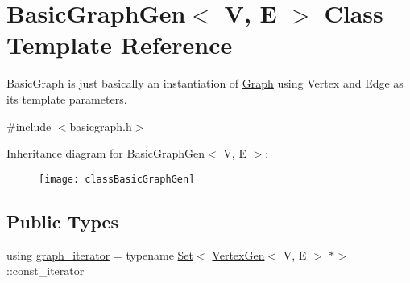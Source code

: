 \hypertarget{classBasicGraphGen}{}\section{Basic\+Graph\+Gen$<$ V, E $>$ Class Template Reference}
\label{classBasicGraphGen}


Basic\+Graph is just basically an instantiation of \mbox{\hyperlink{classGraph}{Graph}} using Vertex and Edge as its template parameters.  




{\ttfamily \#include $<$basicgraph.\+h$>$}

Inheritance diagram for Basic\+Graph\+Gen$<$ V, E $>$\+:\begin{figure}[H]
\begin{center}
\leavevmode
\texttt{[image: classBasicGraphGen]}
\end{center}
\end{figure}
\subsection*{Public Types}
\begin{DoxyCompactItemize}
\item 
using \mbox{\hyperlink{classGraph_a695969c31e87f9e8319d74e5ca39024b}{graph\+\_\+iterator}} = typename \mbox{\hyperlink{classstanfordcpplib_1_1collections_1_1GenericSet}{Set}}$<$ \mbox{\hyperlink{classVertexGen}{Vertex\+Gen}}$<$ V, E $>$ $\ast$$>$\+::const\+\_\+iterator
\end{DoxyCompactItemize}

